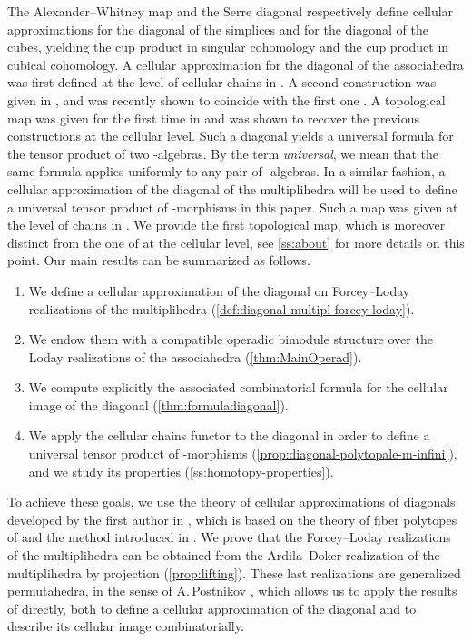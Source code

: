 \documentclass[JEP,XML,SOM,NoFloatCountersInSection,Unicode,published]{cedram}
\theoremstyle{definition}
\theoremstyle{plain}
\begin{document}
The Alexander--Whitney map \cite{EilenbergMacLane53} and the Serre diagonal \cite{Serre51} respectively define cellular approximations for the diagonal of the simplices and for the diagonal of the cubes, yielding the cup product in singular cohomology and the cup product in cubical cohomology.
A cellular approximation for the diagonal of the associahedra was first defined at the level of cellular chains in \cite{SaneblidzeUmble04}.
A second construction was given in \cite{MarklShnider06}, and was recently shown to coincide with the first one \cite{saneblidzeComparingDiagonalsAssociahedra2022a}.
A topological map was given for the first time in \cite{MTTV19} and was shown to recover the previous constructions at the cellular level.
Such a diagonal yields a universal formula for the tensor product of two \Ainf-algebras.
By the term \textit{universal}, we mean that the same formula applies uniformly to any pair of \Ainf-algebras.
In a similar fashion, a cellular approximation of the diagonal of the multiplihedra will be used to define a universal tensor product of \Ainf-morphisms in this paper.
Such a map was given at the level of chains in \cite{SaneblidzeUmble04}. We provide the first topological map, which is moreover distinct from the one of \cite{SaneblidzeUmble04} at the cellular level, see \cref{ss:about} for more details on this point.
Our main results can be summarized as follows.
\begin{enumerate}
\item\label{enum:1}
We define a cellular approximation of the diagonal on Forcey--Loday realizations of the multiplihedra (\cref{def:diagonal-multipl-forcey-loday}).
\item\label{enum:2}
We endow them with a compatible operadic bimodule structure over the Loday realizations of the associahedra (\cref{thm:MainOperad}).
\item\label{enum:3}
We compute explicitly the associated combinatorial formula for the cellular image of the diagonal (\cref{thm:formuladiagonal}).
\item\label{enum:4}
We apply the cellular chains functor to the diagonal in order to define a universal tensor product of \Ainf-morphisms (\cref{prop:diagonal-polytopale-m-infini}), and we study its properties (\cref{ss:homotopy-properties}).
\end{enumerate}

To achieve these goals, we use the theory of cellular approximations of diagonals developed by the first author in \cite{LA21}, which is based on the theory of fiber polytopes of \cite{BilleraSturmfels92} and the method introduced in \cite{MTTV19}.
We prove that the Forcey--Loday realizations of the multiplihedra \cite{Forcey08} can be obtained from the Ardila--Doker realization of the multiplihedra \cite{AD13} by projection (\cref{prop:lifting}).
These last realizations are generalized permutahedra, in the sense of A.\,Postnikov \cite{Postnikov09}, which allows us to apply the results of \cite{LA21} directly, both to define a cellular approximation of the diagonal and to describe its cellular image combinatorially.
\end{document}
